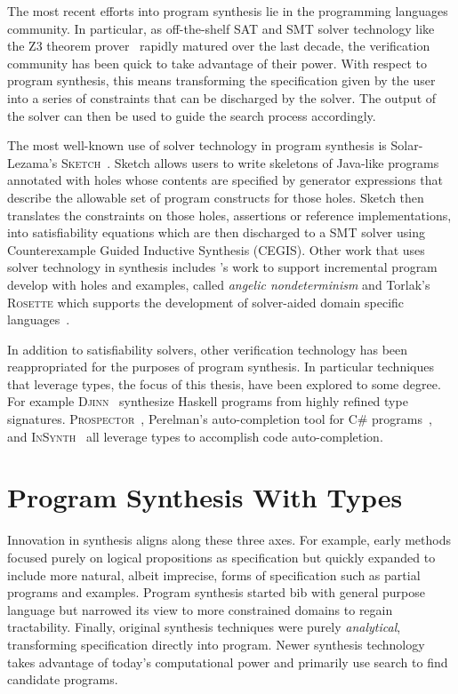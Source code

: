 The most recent efforts into program synthesis lie in the programming languages community.
In particular, as off-the-shelf SAT and SMT solver technology like the Z3 theorem prover~\citep{demoura-tacas-2008} rapidly matured over the last decade, the verification community has been quick to take advantage of their power.
With respect to program synthesis, this means transforming the specification given by the user into a series of constraints that can be discharged by the solver.
The output of the solver can then be used to guide the search process accordingly.

The most well-known use of solver technology in program synthesis is Solar-Lezama's \textsc{Sketch}~\citep{solar-lezama-thesis-2008}.
Sketch allows users to write skeletons of Java-like programs annotated with holes whose contents are specified by generator expressions that describe the allowable set of program constructs for those holes.
Sketch then translates the constraints on those holes, \eg assertions or reference implementations, into satisfiability equations which are then discharged to a SMT solver using Counterexample Guided Inductive Synthesis (CEGIS).
Other work that uses solver technology in synthesis includes \citet{bodik-popl-2010}'s work to support incremental program develop with holes and examples, called \emph{angelic nondeterminism} and Torlak's \textsc{Rosette} which supports the development of solver-aided domain specific languages~\citep{torlak-pldi-2014}.

In addition to satisfiability solvers, other verification technology has been reappropriated for the purposes of program synthesis.
In particular techniques that leverage types, the focus of this thesis, have been explored to some degree.
For example \textsc{Djinn}~\citep{augustsson-2004} synthesize Haskell programs from highly refined type signatures.
\textsc{Prospector}~\citep{mandelin-pldi-2005}, Perelman's auto-completion tool for C\# programs~\citep{perelman-pldi-2012}, and \textsc{InSynth}~\citep{gvero-pldi-2013} all leverage types to accomplish code auto-completion.

\section{Program Synthesis With Types}

Innovation in synthesis aligns along these three axes.  For example, early
methods focused purely on logical propositions as specification but quickly
expanded to include more natural, albeit imprecise, forms of specification such
as partial programs and examples.  Program synthesis started bib with general
purpose language but narrowed its view to more constrained domains to regain
tractability.  Finally, original synthesis techniques were purely
\emph{analytical}, transforming specification directly into program.  Newer
synthesis technology takes advantage of today's computational power and
primarily use search to find candidate programs.


